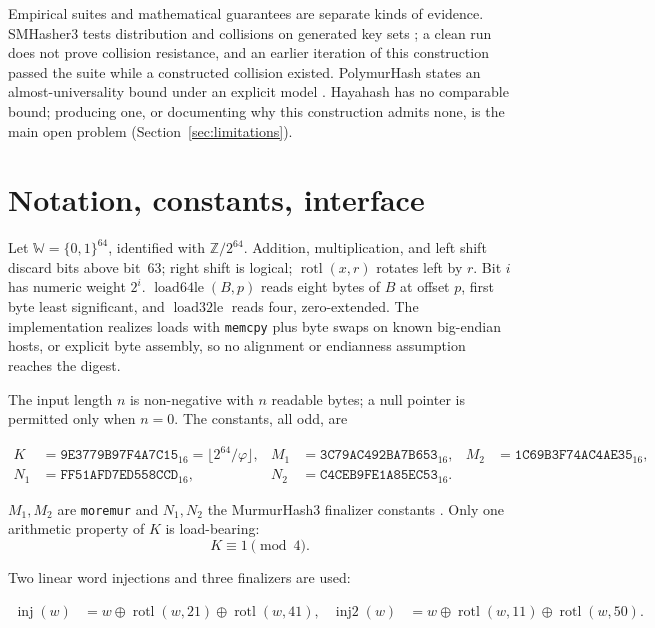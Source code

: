 \documentclass[10pt,a4paper]{article}
\theoremstyle{remark}
\newcommand{\rotl}{\operatorname{rotl}}
\newcommand{\load}{\operatorname{load64le}}
\newcommand{\loadd}{\operatorname{load32le}}
\newcommand{\inj}{\operatorname{inj}}
\newcommand{\injb}{\operatorname{inj2}}
\newcommand{\W}{\mathbb{W}}
\begin{document}
Empirical suites and mathematical guarantees are separate kinds of evidence.
SMHasher3 tests distribution and collisions on generated key sets
\cite{wojcik2022smhasher3}; a clean run does not prove collision resistance,
and an earlier iteration of this construction passed the suite while a
constructed collision existed.  PolymurHash states an almost-universality
bound under an explicit model \cite{peters2023polymurhash}.  Hayahash has no
comparable bound; producing one, or documenting why this construction admits
none, is the main open problem (Section~\ref{sec:limitations}).

\section{Notation, constants, interface}
\label{sec:contract}

Let \(\W = \{0,1\}^{64}\), identified with \(\mathbb{Z}/2^{64}\).  Addition,
multiplication, and left shift discard bits above bit~63; right shift is
logical; \(\rotl(x,r)\) rotates left by \(r\).  Bit \(i\) has numeric weight
\(2^i\).  \(\load(B,p)\) reads eight bytes of \(B\) at offset \(p\), first
byte least significant, and \(\loadd\) reads four, zero-extended.  The
implementation realizes loads with \texttt{memcpy} plus byte swaps on known
big-endian hosts, or explicit byte assembly, so no alignment or endianness
assumption reaches the digest.

The input length \(n\) is non-negative with \(n\) readable bytes; a null
pointer is permitted only when \(n=0\).  The constants, all odd, are

\begin{align*}
K   &= \mathtt{9E3779B97F4A7C15}_{16} = \lfloor 2^{64}/\varphi \rfloor, &
M_1 &= \mathtt{3C79AC492BA7B653}_{16}, &
M_2 &= \mathtt{1C69B3F74AC4AE35}_{16},\\
N_1 &= \mathtt{FF51AFD7ED558CCD}_{16}, &
N_2 &= \mathtt{C4CEB9FE1A85EC53}_{16}. & &
\end{align*}

\(M_1, M_2\) are \texttt{moremur} \cite{evensen2018moremur} and \(N_1, N_2\)
the MurmurHash3 finalizer constants \cite{appleby2011murmurhash3}.  Only one
arithmetic property of \(K\) is load-bearing:
\begin{equation}
\label{eq:kmod4}
K \equiv 1 \pmod 4 .
\end{equation}

Two linear word injections and three finalizers are used:

\begin{align*}
\inj(w)  &= w \oplus \rotl(w,21) \oplus \rotl(w,41), &
\injb(w) &= w \oplus \rotl(w,11) \oplus \rotl(w,50).
\end{align*}
\end{document}

